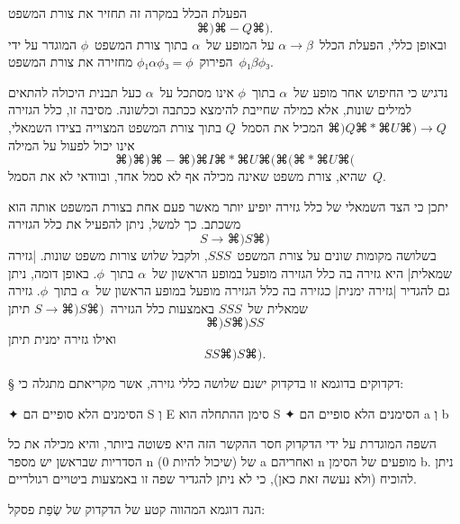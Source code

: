 הפעלת הכלל
במקרה זה תחזיר את צורת המשפט
\begin{equation*}
  ⌘)⌘-Q⌘).
\end{equation*}
ובאופן כללי, הפעלת הכלל~$α→β$ על המופע של~$α$ בתוך צורת המשפט~$ϕ$ המוגדר על ידי
הפירוק~$ϕ₁αϕ₃=ϕ$ מחזירה את צורת המשפט~$ϕ₁βϕ₃$.

נדגיש כי החיפוש אחר מופע של~$α$ בתוך~$ϕ$ אינו מסתכל על~$α$ כעל תבנית היכולה
להתאים למילים שונות, אלא כמילה שחייבת להימצא ככתבה וכלשונה. מסיבה זו, כלל
הגזירה
$⌘)Q⌘*⌘U⌘)→Q$ המכיל את הסמל~$Q$ בתוך צורת המשפט המצוייה בצידו השמאלי,
אינו יכול לפעול על המילה
\begin{equation*}
  ⌘)⌘)⌘-⌘)⌘I⌘*⌘U ⌘(⌘(⌘*⌘U⌘(
\end{equation*}
שהיא, צורת משפט שאינה מכילה אף לא סמל אחד, ובוודאי לא את הסמל~$Q$.

יתכן כי הצד השמאלי של כלל גזירה יופיע יותר מאשר פעם אחת בצורת
המשפט אותה הוא משכתב. כך למשל, ניתן להפעיל את כלל הגזירה
\begin{equation}
  \label{eq:parenthesis:rewrite}
  S→⌘) S ⌘)
\end{equation}
בשלושה מקומות שונים על צורת המשפט~$SSS$, ולקבל שלוש צורות משפט שונות.
\ע|גזירה שמאלית| היא גזירה בה כלל הגזירה מופעל במופע הראשון של~$α$ בתוך~$ϕ$.
באופן דומה, ניתן גם להגדיר \ע|גזירה ימנית| כגזירה בה כלל הגזירה מופעל במופע
הראשון של~$α$ בתוך~$ϕ$. גזירה שמאלית של~$SSS$ באמצעות כלל הגזירה~$S→⌘)S⌘)$ תיתן
\begin{equation*}
  ⌘)S⌘)SS
\end{equation*}
ואילו גזירה ימנית תיתן
\begin{equation*}
  SS ⌘) S ⌘).
\end{equation*}

§ דקדוקים
בדוגמא זו בדקדוק ישנם שלושה כללי גזירה, אשר מקריאתם מתגלה כי:
\begin{enumerate}
  ✦
  הסימנים הלא סופיים הם S וְ E
  סימן ההתחלה הוא S
  ✦
  הסימנים הלא סופיים הם a וְ b
\end{enumerate}

השפה המוגדרת על ידי הדקדוק חסר ההקשר הזה היא פשוטה ביותר, והיא מכילה את
כל הסדריות שבראשן יש מספר n (שיכול להיות 0) של a ואחריהם n מופעים של
הסימן b.
ניתן להוכיח (ולא נעשה זאת כאן), כי לא ניתן להגדיר שפה זו באמצעות ביטויים
רגולריים.

הנה דוגמא המהווה קטע של הדקדוק של שְׂפַת פסקל:

